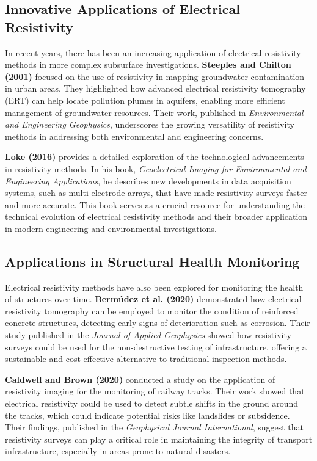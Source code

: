\documentclass[12pt,a4paper]{report}
\begin{document}
\subsection{Innovative Applications of Electrical Resistivity}
In recent years, there has been an increasing application of electrical resistivity methods in more complex subsurface investigations. \textbf{Steeples and Chilton (2001)} focused on the use of resistivity in mapping groundwater contamination in urban areas. They highlighted how advanced electrical resistivity tomography (ERT) can help locate pollution plumes in aquifers, enabling more efficient management of groundwater resources. Their work, published in \textit{Environmental and Engineering Geophysics}, underscores the growing versatility of resistivity methods in addressing both environmental and engineering concerns.

\textbf{Loke (2016)} provides a detailed exploration of the technological advancements in resistivity methods. In his book, \textit{Geoelectrical Imaging for Environmental and Engineering Applications}, he describes new developments in data acquisition systems, such as multi-electrode arrays, that have made resistivity surveys faster and more accurate. This book serves as a crucial resource for understanding the technical evolution of electrical resistivity methods and their broader application in modern engineering and environmental investigations.

\subsection{Applications in Structural Health Monitoring}
Electrical resistivity methods have also been explored for monitoring the health of structures over time. \textbf{Bermúdez et al. (2020)} demonstrated how electrical resistivity tomography can be employed to monitor the condition of reinforced concrete structures, detecting early signs of deterioration such as corrosion. Their study published in the \textit{Journal of Applied Geophysics} showed how resistivity surveys could be used for the non-destructive testing of infrastructure, offering a sustainable and cost-effective alternative to traditional inspection methods.

\textbf{Caldwell and Brown (2020)} conducted a study on the application of resistivity imaging for the monitoring of railway tracks. Their work showed that electrical resistivity could be used to detect subtle shifts in the ground around the tracks, which could indicate potential risks like landslides or subsidence. Their findings, published in the \textit{Geophysical Journal International}, suggest that resistivity surveys can play a critical role in maintaining the integrity of transport infrastructure, especially in areas prone to natural disasters.
\end{document}
